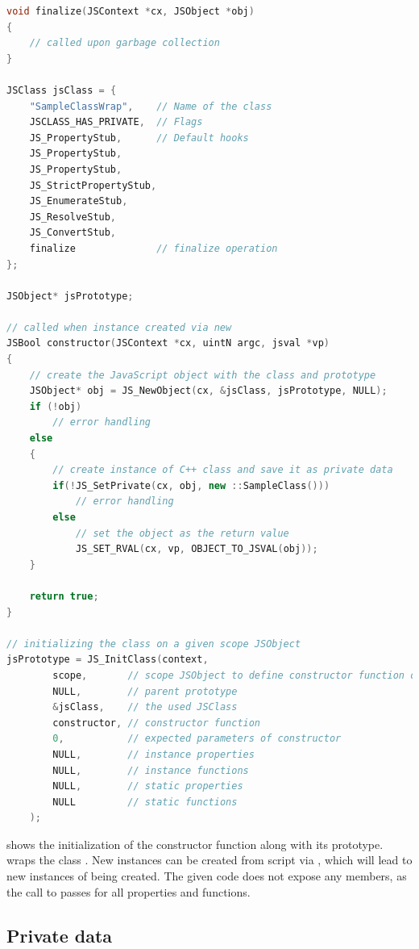 \SingleSpacing
\begin{lstlisting}[language=C++, caption=Initializing a class, label=lst:InitClass]
void finalize(JSContext *cx, JSObject *obj)
{
	// called upon garbage collection
}

JSClass jsClass = {
	"SampleClassWrap",    // Name of the class
	JSCLASS_HAS_PRIVATE,  // Flags
	JS_PropertyStub,      // Default hooks
	JS_PropertyStub, 
	JS_PropertyStub, 
	JS_StrictPropertyStub,
	JS_EnumerateStub, 
	JS_ResolveStub, 
	JS_ConvertStub, 
	finalize              // finalize operation
};

JSObject* jsPrototype;

// called when instance created via new
JSBool constructor(JSContext *cx, uintN argc, jsval *vp)
{
	// create the JavaScript object with the class and prototype
	JSObject* obj = JS_NewObject(cx, &jsClass, jsPrototype, NULL);
	if (!obj)
		// error handling
	else
	{
		// create instance of C++ class and save it as private data
		if(!JS_SetPrivate(cx, obj, new ::SampleClass()))
			// error handling
		else
			// set the object as the return value
			JS_SET_RVAL(cx, vp, OBJECT_TO_JSVAL(obj));
	}
	
	return true;
}

// initializing the class on a given scope JSObject
jsPrototype = JS_InitClass(context, 
		scope,       // scope JSObject to define constructor function on	
		NULL,        // parent prototype
		&jsClass,    // the used JSClass
		constructor, // constructor function
		0,           // expected parameters of constructor
		NULL,        // instance properties
		NULL,        // instance functions
		NULL,        // static properties
		NULL         // static functions
	);
\end{lstlisting}
\OnehalfSpacing

 shows the initialization of the constructor function  along with its prototype.  wraps the  class . New instances can be created from script via , which will lead to new instances of  being created. The given code does not expose any members, as the call to  passes  for all properties and functions.

\subsection{Private data}
\label{sec:PrivateData}

